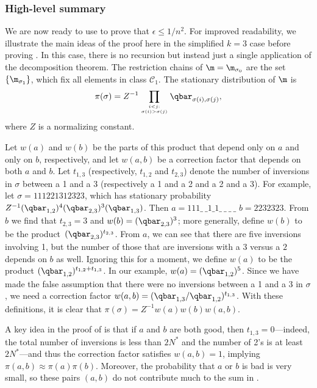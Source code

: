 %
\subsubsection{High-level summary}  %
 We are now ready to use  to prove 
that  %
$\epsilon\leq 1/n^2$. %
For improved 
readability, we illustrate the main ideas of the proof here 
in the simplified $k=3$ case before proving . 
In this case, there is no recursion but 
instead just a single application of the decomposition theorem.  The 
restriction chains of $\m=\m_{\sigma_0}$ are the set 
$\{\m_{\sigma_1}\}$, which 
fix all elements in class $\mathcal{C}_1$.  
The stationary distribution of $\m$ is
\begin{equation}\label{eq:statdist}
\pi(\sigma) = Z^{-1} \prod_{i < j:\atop \sigma(i) > \sigma(j)}\qbar_{\sigma(i), \sigma(j)},
\end{equation}
where $Z$ is a normalizing constant.

Let $w(a)$ and $ w(b)$ be the parts of this product that depend only on 
$a$ and only on $b$, respectively, and let $w(a,b)$ be a correction 
factor that depends on both $a$ and $b$.  Let $t_{1,3}$ (respectively, 
$t_{1,2}$ and $t_{2,3}$) denote the number of inversions in $\sigma$ 
between a 1 and a 3 (respectively a 1 and a 2 and a 2 and a 3). For 
example, let $\sigma = 111221312323$, which has stationary probability 
$Z^{-1}(\qbar_{1,2})^4(\qbar_{2,3})^3(\qbar_{1,3})$.  Then $a=111\_\ \_1\_1\_\ \_\ \_\ \_$ 
$b=2232323$.  From $b$ we find that $t_{2,3}=3$ and 
$w(b)=(\qbar_{2,3})^3$; more generally, define $w(b)$ to be the 
product~$(\qbar_{2,3})^{t_{2,3}}$. From $a$, we can see that there are five 
inversions involving 1, but the number of those that are inversions 
with a $3$ versus a $2$ depends on $b$ as well. Ignoring this for a 
moment, we define $w(a)$ to be the product $(\qbar_{1,2})^{t_{1,2}+t_{1,3}}$. 
In our example, $w(a)=(\qbar_{1,2})^5$.  Since we have made the false 
assumption that there were no inversions between a 1 and a 3 in 
$\sigma$, we need a correction factor 
$w(a,b)=(\qbar_{1,3}/\qbar_{1,2})^{t_{1,3}}$.
With these definitions, it is clear that $\pi(\sigma)=Z^{-1}w(a)w(b)w(a,b)$.


A key idea in the proof of  is that if $a$ and $b$ are both good, then 
$t_{1,3}=0$---indeed, the total number of inversions is less than 
$2N^*$ and the number of 2's is at least $2N^*$---and thus the 
correction factor satisfies $w(a,b)=1$, implying $\pi(a,b)\approx \pi(a)\pi(b)$. 
Moreover, the probability that $a$ or $b$ is bad is very small, so 
these pairs $(a,b)$ do not contribute much to the sum in 
.  

